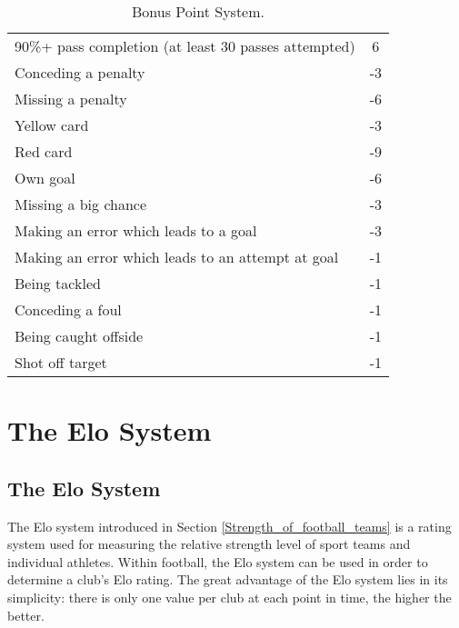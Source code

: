 \begin{table}[H]
\begin{tabular}{|l|c|}
90\%+ pass completion (at least 30 passes attempted)                     & 6   \\
Conceding a penalty                                                      & -3  \\
Missing a penalty                                                        & -6  \\
Yellow card                                                              & -3  \\
Red card                                                                 & -9  \\
Own goal                                                                 & -6  \\
Missing a big chance                                                     & -3  \\
Making an error which leads to a goal                                    & -3  \\
Making an error which leads to an attempt at goal                        & -1  \\
Being tackled                                                            & -1  \\
Conceding a foul                                                         & -1  \\
Being caught offside                                                     & -1  \\
Shot off target                                                          & -1 \\
\hline
\end{tabular}
\caption{Bonus Point System.}
\end{table}



\chapter{The Elo System}
\section{The Elo System}\label{A2_Elo_System}


The Elo system introduced in Section \ref{Strength_of_football_teams} is a rating system used for measuring the relative strength level of sport teams and individual athletes. Within football, the Elo system can be used in order to determine a club's Elo rating. The great advantage of the Elo system lies in its simplicity: there is only one value per club at each point in time, the higher the better. 

